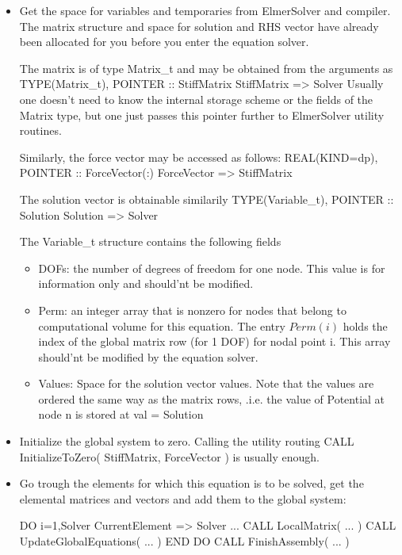 \begin{itemize}
\item Get the space for variables and temporaries from ElmerSolver and compiler.
The matrix structure and space for solution and RHS vector have already been
allocated for you before you enter the equation solver.

The matrix is of type Matrix\_t and may be obtained from the arguments as
\ttbegin
TYPE(Matrix_t), POINTER :: StiffMatrix
StiffMatrix => Solver %
\ttend
Usually one doesn't need to know the internal storage scheme or the fields
of the Matrix type, but one just passes this pointer further to ElmerSolver
utility routines.

Similarly, the force vector may be accessed as follows:
\ttbegin
REAL(KIND=dp), POINTER :: ForceVector(:)
ForceVector => StiffMatrix %
\ttend

The solution vector is obtainable similarily
\ttbegin
TYPE(Variable_t), POINTER :: Solution
Solution => Solver %
\ttend

The Variable\_t structure contains the following fields
\begin{itemize}
\item DOFs: the number of degrees of freedom for one node. This value is for
information only and should'nt be modified.
\item Perm: an integer array that is nonzero for nodes that belong
to computational volume for this equation. The entry $Perm(i)$ holds
the index of the global matrix row  (for 1 DOF) for nodal point i.
This array  should'nt be modified by the equation solver.
\item Values: Space for the solution vector values.
Note that the values
are ordered the same way as the matrix rows, .i.e. the value of Potential at node
n is stored at
\ttbegin
  val = Solution %
\ttend
\end{itemize}


\item Initialize the global system to zero. Calling the utility routing
\ttbegin
CALL InitializeToZero( StiffMatrix, ForceVector )
\ttend
is usually enough.


\item Go trough the elements for which this equation is to 
be solved, get the elemental matrices and vectors and add them to
the global system:

\ttbegin
DO i=1,Solver %
   CurrentElement => Solver %
      ...
   CALL LocalMatrix( ... )
   CALL UpdateGlobalEquations( ... )
END DO
CALL FinishAssembly( ... )
\ttend


\end{itemize}
